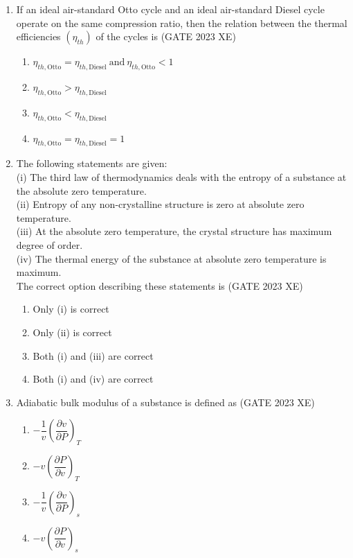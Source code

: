 \documentclass[journal,12pt,onecolumn]{IEEEtran}
\begin{document}
\begin{enumerate}
\item If an ideal air-standard Otto cycle and an ideal air-standard Diesel cycle operate on the same compression ratio, then the relation between the thermal efficiencies $(\eta_{th})$ of the cycles is
\hfill{(GATE 2023 XE)}

\begin{multicols}{2}
\begin{enumerate}
\item $\eta_{th,\text{Otto}}=\eta_{th,\text{Diesel}} \ \text{and}\ \eta_{th,\text{Otto}}<1$
\item $\eta_{th,\text{Otto}}>\eta_{th,\text{Diesel}}$
\item $\eta_{th,\text{Otto}}<\eta_{th,\text{Diesel}}$
\item $\eta_{th,\text{Otto}}=\eta_{th,\text{Diesel}}=1$
\end{enumerate}
\end{multicols}

\item The following statements are given: \\
(i) The third law of thermodynamics deals with the entropy of a substance at the absolute zero temperature. \\
(ii) Entropy of any non-crystalline structure is zero at absolute zero temperature. \\
(iii) At the absolute zero temperature, the crystal structure has maximum degree of order. \\
(iv) The thermal energy of the substance at absolute zero temperature is maximum. \\
The correct option describing these statements is
\hfill{(GATE 2023 XE)}

\begin{multicols}{2}
\begin{enumerate}
\item Only (i) is correct
\item Only (ii) is correct
\item Both (i) and (iii) are correct
\item Both (i) and (iv) are correct
\end{enumerate}
\end{multicols}

\item Adiabatic bulk modulus of a substance is defined as
\hfill{(GATE 2023 XE)}

\begin{multicols}{2}
\begin{enumerate}
\item $-\dfrac{1}{v}\left(\dfrac{\partial v}{\partial P}\right)_T$
\item $-v\left(\dfrac{\partial P}{\partial v}\right)_T$
\item $-\dfrac{1}{v}\left(\dfrac{\partial v}{\partial P}\right)_s$
\item $-v\left(\dfrac{\partial P}{\partial v}\right)_s$
\end{enumerate}
\end{multicols}


\end{enumerate}
\end{document}
